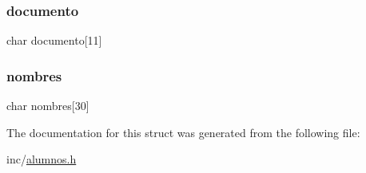 \subsubsection{\texorpdfstring{documento}{documento}}
{\footnotesize\ttfamily char documento\mbox{[}11\mbox{]}}

\mbox{\label{structalumno__s_a1f4dfcb0f32082d74e1686c35f6dde7d}} 
\subsubsection{\texorpdfstring{nombres}{nombres}}
{\footnotesize\ttfamily char nombres\mbox{[}30\mbox{]}}



The documentation for this struct was generated from the following file\+:\begin{DoxyCompactItemize}
\item 
inc/\hyperlink{alumnos_8h}{alumnos.\+h}\end{DoxyCompactItemize}
